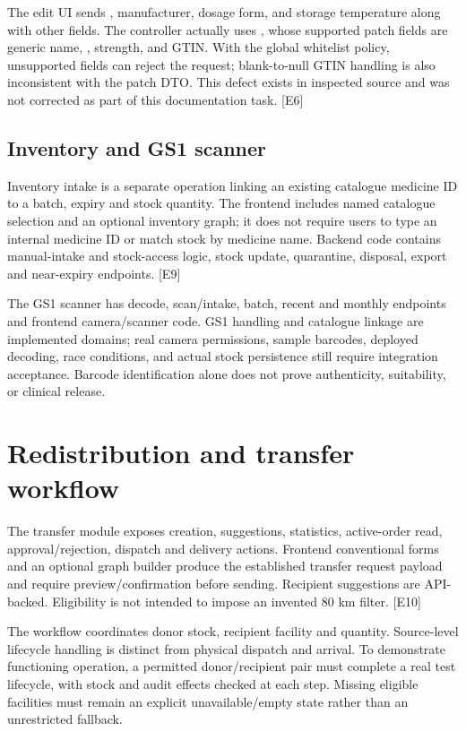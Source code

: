 \documentclass[11pt,a4paper]{article}
\newcommand{\source}[1]{{\small\path{#1}}}
\newcommand{\evidence}[1]{\textcolor{muted}{[E#1]}}
\begin{document}
The edit UI sends \source{brand_name}, manufacturer, dosage form, and storage temperature along with other fields. The controller actually uses \source{PatchMedicineCatalogDto}, whose supported patch fields are generic name, \source{brand}, strength, and GTIN. With the global whitelist policy, unsupported fields can reject the request; blank-to-null GTIN handling is also inconsistent with the patch DTO. This defect exists in inspected source and was not corrected as part of this documentation task. \evidence{6}

\subsection{Inventory and GS1 scanner}
Inventory intake is a separate operation linking an existing catalogue medicine ID to a batch, expiry and stock quantity. The frontend includes named catalogue selection and an optional inventory graph; it does not require users to type an internal medicine ID or match stock by medicine name. Backend code contains manual-intake and stock-access logic, stock update, quarantine, disposal, export and near-expiry endpoints. \evidence{9}

The GS1 scanner has decode, scan/intake, batch, recent and monthly endpoints and frontend camera/scanner code. GS1 handling and catalogue linkage are implemented domains; real camera permissions, sample barcodes, deployed decoding, race conditions, and actual stock persistence still require integration acceptance. Barcode identification alone does not prove authenticity, suitability, or clinical release.

\section{Redistribution and transfer workflow}
The transfer module exposes creation, suggestions, statistics, active-order read, approval/rejection, dispatch and delivery actions. Frontend conventional forms and an optional graph builder produce the established transfer request payload and require preview/confirmation before sending. Recipient suggestions are API-backed. Eligibility is not intended to impose an invented 80 km filter. \evidence{10}

The workflow coordinates donor stock, recipient facility and quantity. Source-level lifecycle handling is distinct from physical dispatch and arrival. To demonstrate functioning operation, a permitted donor/recipient pair must complete a real test lifecycle, with stock and audit effects checked at each step. Missing eligible facilities must remain an explicit unavailable/empty state rather than an unrestricted fallback.
\end{document}
